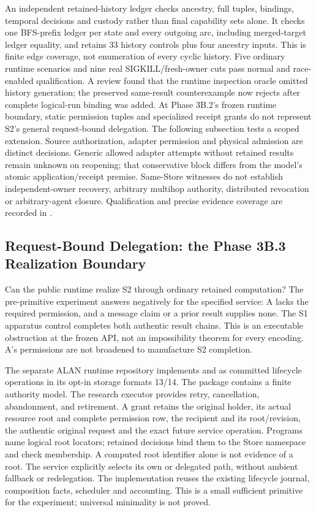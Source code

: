 \documentclass[11pt,a4paper]{article}
\theoremstyle{definition}
\theoremstyle{remark}
\begin{document}
An independent retained-history ledger checks ancestry, full tuples, bindings, temporal decisions and custody rather than final capability sets alone. It checks one BFS-prefix ledger per state and every outgoing arc, including merged-target ledger equality, and retains 33 history controls plus four ancestry inputs. This is finite edge coverage, not enumeration of every cyclic history. Five ordinary runtime scenarios and nine real SIGKILL/fresh-owner cuts pass normal and race-enabled qualification. A review found that the runtime inspection oracle omitted history generation; the preserved same-result counterexample now rejects after complete logical-run binding was added. At Phase 3B.2's frozen runtime boundary, static permission tuples and specialized receipt grants do not represent S2's general request-bound delegation. The following subsection tests a scoped extension. Source authorization, adapter permission and physical admission are distinct decisions. Generic allowed adapter attempts without retained results remain unknown on reopening; that conservative block differs from the model's atomic application/receipt premise. Same-Store witnesses do not establish independent-owner recovery, arbitrary multihop authority, distributed revocation or arbitrary-agent closure. Qualification and precise evidence coverage are recorded in .

\subsection{Request-Bound Delegation: the Phase 3B.3 Realization Boundary}

Can the public runtime realize S2 through ordinary retained computation? The pre-primitive experiment answers negatively for the specified service: A lacks the required permission, and a message claim or a prior result supplies none. The S1 apparatus control completes both authentic result chains. This is an executable obstruction at the frozen API, not an impossibility theorem for every encoding. A's permissions are not broadened to manufacture S2 completion.

The separate ALAN runtime repository implements  and  as committed lifecycle operations in its opt-in storage formats 13/14. The  package contains a finite authority model. The research executor provides retry, cancellation, abandonment, and retirement. A grant retains the original holder, its actual resource root and complete permission row, the recipient and its root/revision, the authentic original request and the exact future service operation. Programs name logical root locators; retained decisions bind them to the Store namespace and check membership. A computed root identifier alone is not evidence of a root. The service explicitly selects its own or delegated path, without ambient fallback or redelegation. The implementation reuses the existing lifecycle journal, composition facts, scheduler and accounting. This is a small sufficient primitive for the experiment; universal minimality is not proved.
\end{document}
